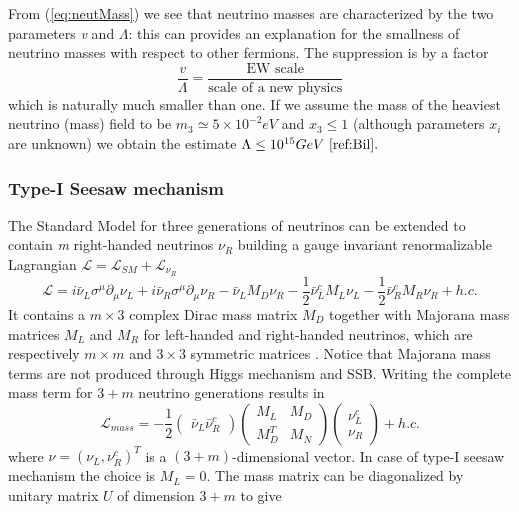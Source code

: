 \documentclass{subnucbo}
\begin{document}
From (\ref{eq:neutMass}) we see that neutrino masses are characterized by the two parameters \emph{v} and $\Lambda$: this can  provides an explanation for the smallness of neutrino masses with respect to other fermions. The suppression is by a factor
\begin{equation}
\frac{v}{\Lambda}=\frac{\text{EW scale}}{\text{scale of a new physics}}
\end{equation}
which is naturally much smaller than one.
If we assume the mass of the heaviest neutrino (mass) field to be $m_3\simeq5\times10^{-2}eV$ and $x_3\leq1$ (although parameters $x_i$ are unknown) we obtain the estimate $\Lambda\leq10^{15}GeV~\cite{ref:Bil}.$

\subsubsection{Type-I Seesaw mechanism}
The Standard Model for three generations of neutrinos can be extended to contain \emph{m} right-handed neutrinos $\nu_R$ building a gauge invariant renormalizable Lagrangian $\mathcal{L}=\mathcal{L}_{SM}+\mathcal{L}_{\nu_R}$ 
\begin{equation}
\label{eq:renormLag}
\mathcal{L}=i\bar{\nu}_L\sigma^{\mu}\partial_{\mu}\nu_L+i\bar{\nu}_R\sigma^{\mu}\partial_{\mu}\nu_R-\bar{\nu}_LM_D\nu_R-\frac{1}{2}\bar{\nu}^c_LM_L\nu_L-\frac{1}{2}\bar{\nu}_R^cM_R\nu_R+h.c.
\end{equation}
It contains a $m\times3$ complex Dirac mass matrix $M_D$ together with Majorana mass matrices $M_L$ and $M_R$ for left-handed and right-handed neutrinos, which are respectively $m\times m$ and $3\times3$ symmetric matrices \cite{ref:Fuji}. 
Notice that Majorana mass terms are not produced through Higgs mechanism and SSB.
Writing the complete mass term for $3+m$ neutrino generations results in 
\begin{equation}
\mathcal{L}_{mass}=-\frac{1}{2}\begin{pmatrix}\bar{\nu}_L \bar{\nu}_R^c\end{pmatrix}\begin{pmatrix}M_L & M_D\\ M_D^T & M_N\end{pmatrix}\begin{pmatrix}\nu_L^c\\ \nu_R\end{pmatrix}+h.c.
\end{equation}
where $\nu=(\nu_L, \nu_R^c)^T$ is a $(3+m)$-dimensional vector. In case of type-I seesaw mechanism the choice is $M_L=0$. The mass matrix can be diagonalized by unitary matrix $U$ of dimension $3+m$ to give 
\end{document}
